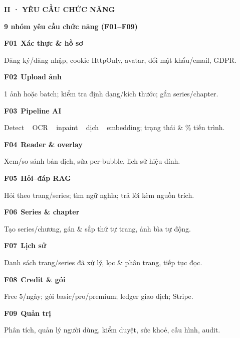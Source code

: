 \documentclass[aspectratio=169,10pt]{beamer}
\newcommand{\kick}[1]{{\headfont\bfseries\footnotesize\textcolor{mred}{\MakeUppercase{#1}}}}
\newcommand{\slidehead}[2]{%
  \kick{#1}\par\vspace{0.6mm}%
  {\headfont\bfseries\LARGE\textcolor{ink}{#2}}\par\vspace{1.2mm}}
\newcommand{\arr}{\textcolor{mred}{\,\raisebox{0.1ex}{$\rightarrow$}\,}}
\begin{document}
\begin{frame}
\slidehead{II · Yêu cầu chức năng}{9 nhóm yêu cầu chức năng (F01–F09)}
\vspace{0.5mm}\scriptsize
\begin{tcbraster}[raster columns=3, raster equal height=rows, raster column skip=2.4mm, raster row skip=2mm]
\begin{tcolorbox}[creamcard]{\headfont\bfseries\color{mred}F01}\ {\headfont\bfseries Xác thực \& hồ sơ}\par\textcolor{slate}{Đăng ký/đăng nhập, cookie HttpOnly, avatar, đổi mật khẩu/email, GDPR.}\end{tcolorbox}
\begin{tcolorbox}[card]{\headfont\bfseries\color{mred}F02}\ {\headfont\bfseries Upload ảnh}\par\textcolor{slate}{1 ảnh hoặc batch; kiểm tra định dạng/kích thước; gắn series/chapter.}\end{tcolorbox}
\begin{tcolorbox}[creamcard]{\headfont\bfseries\color{mred}F03}\ {\headfont\bfseries Pipeline AI}\par\textcolor{slate}{Detect \arr\ OCR \arr\ inpaint \arr\ dịch \arr\ embedding; trạng thái \& \% tiến trình.}\end{tcolorbox}
\begin{tcolorbox}[card]{\headfont\bfseries\color{mred}F04}\ {\headfont\bfseries Reader \& overlay}\par\textcolor{slate}{Xem/so sánh bản dịch, sửa per-bubble, lịch sử hiệu đính.}\end{tcolorbox}
\begin{tcolorbox}[creamcard]{\headfont\bfseries\color{mred}F05}\ {\headfont\bfseries Hỏi–đáp RAG}\par\textcolor{slate}{Hỏi theo trang/series; tìm ngữ nghĩa; trả lời kèm nguồn trích.}\end{tcolorbox}
\begin{tcolorbox}[card]{\headfont\bfseries\color{mred}F06}\ {\headfont\bfseries Series \& chapter}\par\textcolor{slate}{Tạo series/chương, gán \& sắp thứ tự trang, ảnh bìa tự động.}\end{tcolorbox}
\begin{tcolorbox}[creamcard]{\headfont\bfseries\color{mred}F07}\ {\headfont\bfseries Lịch sử}\par\textcolor{slate}{Danh sách trang/series đã xử lý, lọc \& phân trang, tiếp tục đọc.}\end{tcolorbox}
\begin{tcolorbox}[card]{\headfont\bfseries\color{mred}F08}\ {\headfont\bfseries Credit \& gói}\par\textcolor{slate}{Free 5/ngày; gói basic/pro/premium; ledger giao dịch; Stripe.}\end{tcolorbox}
\begin{tcolorbox}[creamcard]{\headfont\bfseries\color{mred}F09}\ {\headfont\bfseries Quản trị}\par\textcolor{slate}{Phân tích, quản lý người dùng, kiểm duyệt, sức khoẻ, cấu hình, audit.}\end{tcolorbox}
\end{tcbraster}
\end{frame}
\end{document}
